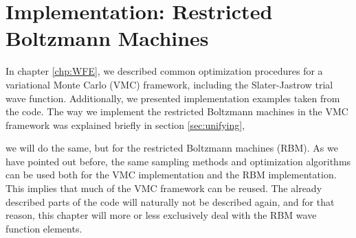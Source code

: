 \chapter{Implementation: Restricted Boltzmann Machines} \label{chp:rbmimplementation}
In chapter \ref{chp:WFE}, we described common optimization procedures for a variational Monte Carlo (VMC) framework, including the Slater-Jastrow trial wave function. Additionally, we presented implementation examples taken from the code. The way we implement the restricted Boltzmann machines in the VMC framework was explained briefly in section \ref{sec:unifying}, 

we will do the same, but for the restricted Boltzmann machines (RBM). As we have pointed out before, the same sampling methods and optimization algorithms can be used both for the VMC implementation and the RBM implementation. This implies that much of the VMC framework can be reused. The already described parts of the code will naturally not be described again, and for that reason, this chapter will more or less exclusively deal with the RBM wave function elements.

